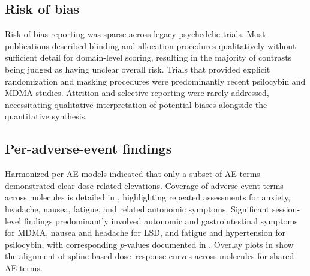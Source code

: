 \subsection{Risk of bias}
Risk-of-bias reporting was sparse across legacy psychedelic trials. Most publications described blinding and allocation procedures qualitatively without sufficient detail for domain-level scoring, resulting in the majority of contrasts being judged as having unclear overall risk. Trials that provided explicit randomization and masking procedures were predominantly recent psilocybin and MDMA studies. Attrition and selective reporting were rarely addressed, necessitating qualitative interpretation of potential biases alongside the quantitative synthesis.

\subsection{Per-adverse-event findings}
Harmonized per-AE models indicated that only a subset of AE terms demonstrated clear dose-related elevations. Coverage of adverse-event terms across molecules is detailed in , highlighting repeated assessments for anxiety, headache, nausea, fatigue, and related autonomic symptoms. Significant session-level findings predominantly involved autonomic and gastrointestinal symptoms for MDMA, nausea and headache for LSD, and fatigue and hypertension for psilocybin, with corresponding $p$-values documented in . Overlay plots in  show the alignment of spline-based dose--response curves across molecules for shared AE terms.


